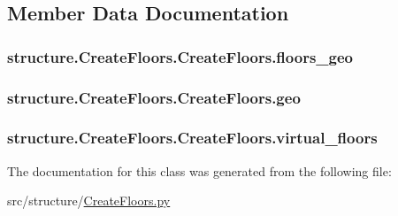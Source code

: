 \subsection{Member Data Documentation}
\hypertarget{classstructure_1_1_create_floors_1_1_create_floors_a1bb632bb44d72df5ad57e25a4da44585}{
\subsubsection[{floors\-\_\-geo}]{\setlength{\rightskip}{0pt plus 5cm}structure.\-Create\-Floors.\-Create\-Floors.\-floors\-\_\-geo}}\label{classstructure_1_1_create_floors_1_1_create_floors_a1bb632bb44d72df5ad57e25a4da44585}
\hypertarget{classstructure_1_1_create_floors_1_1_create_floors_a4b6974fee8c79a06af299202a961b835}{
\subsubsection[{geo}]{\setlength{\rightskip}{0pt plus 5cm}structure.\-Create\-Floors.\-Create\-Floors.\-geo}}\label{classstructure_1_1_create_floors_1_1_create_floors_a4b6974fee8c79a06af299202a961b835}
\hypertarget{classstructure_1_1_create_floors_1_1_create_floors_a06a8ed4378e0be621469a68a82d0db15}{
\subsubsection[{virtual\-\_\-floors}]{\setlength{\rightskip}{0pt plus 5cm}structure.\-Create\-Floors.\-Create\-Floors.\-virtual\-\_\-floors}}\label{classstructure_1_1_create_floors_1_1_create_floors_a06a8ed4378e0be621469a68a82d0db15}


The documentation for this class was generated from the following file\-:\begin{DoxyCompactItemize}
\item 
src/structure/\hyperlink{_create_floors_8py}{Create\-Floors.\-py}\end{DoxyCompactItemize}
